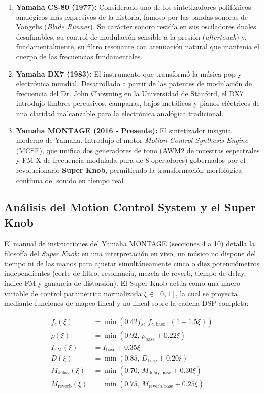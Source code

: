 \documentclass[11pt,a4paper]{article}
\begin{document}
\begin{enumerate}
    \item \textbf{Yamaha CS-80 (1977):} Considerado uno de los sintetizadores polifónicos analógicos más expresivos de la historia, famoso por las bandas sonoras de Vangelis (\textit{Blade Runner}). Su carácter sonoro residía en sus osciladores duales desafinables, su control de modulación sensible a la presión (\textit{aftertouch}) y, fundamentalmente, su filtro resonante con atenuación natural que mantenía el cuerpo de las frecuencias fundamentales.
    \item \textbf{Yamaha DX7 (1983):} El instrumento que transformó la música pop y electrónica mundial. Desarrollado a partir de las patentes de modulación de frecuencia del Dr. John Chowning en la Universidad de Stanford, el DX7 introdujo timbres percusivos, campanas, bajos metálicos y pianos eléctricos de una claridad inalcanzable para la electrónica analógica tradicional.
    \item \textbf{Yamaha MONTAGE (2016 - Presente):} El sintetizador insignia moderno de Yamaha. Introdujo el motor \textit{Motion Control Synthesis Engine} (MCSE), que unifica dos generadores de tono (AWM2 de muestras espectrales y FM-X de frecuencia modulada pura de 8 operadores) gobernados por el revolucionario \textbf{Super Knob}, permitiendo la transformación morfológica continua del sonido en tiempo real.
\end{enumerate}

\subsection{Análisis del Motion Control System y el Super Knob}
El manual de instrucciones del Yamaha MONTAGE (secciones 4 a 10) detalla la filosofía del \textit{Super Knob}: en una interpretación en vivo, un músico no dispone del tiempo ni de las manos para ajustar simultáneamente cinco o diez potenciómetros independientes (corte de filtro, resonancia, mezcla de reverb, tiempo de delay, índice FM y ganancia de distorsión). El Super Knob actúa como una macro-variable de control paramétrico normalizada $\xi \in [0, 1]$, la cual se proyecta mediante funciones de mapeo lineal y no lineal sobre la cadena DSP completa:

\begin{align}
f_c(\xi) &= \min\left(0.42 f_s, \, f_{c,\text{base}} \cdot (1 + 1.5 \xi)\right) \\
\rho(\xi) &= \min\left(0.92, \, \rho_{\text{base}} + 0.22 \xi\right) \\
I_{\text{FM}}(\xi) &= I_{\text{base}} + 0.35 \xi \\
D(\xi) &= \min\left(0.85, \, D_{\text{base}} + 0.20 \xi\right) \\
M_{\text{delay}}(\xi) &= \min\left(0.70, \, M_{\text{delay,base}} + 0.30 \xi\right) \\
M_{\text{reverb}}(\xi) &= \min\left(0.75, \, M_{\text{reverb,base}} + 0.25 \xi\right)
\end{align}
\end{document}
